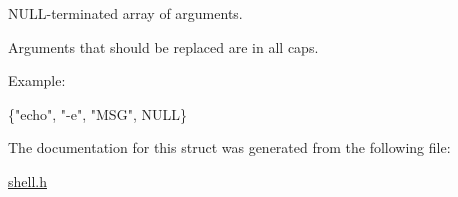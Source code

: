 N\+U\+L\+L-\/terminated array of arguments. 

Arguments that should be replaced are in all caps.

Example\+: 
\begin{DoxyCode}
\{\textcolor{stringliteral}{"echo"}, \textcolor{stringliteral}{"-e"}, \textcolor{stringliteral}{"MSG"}, NULL\}
\end{DoxyCode}
 

The documentation for this struct was generated from the following file\+:\begin{DoxyCompactItemize}
\item 
\hyperlink{shell_8h}{shell.\+h}\end{DoxyCompactItemize}
